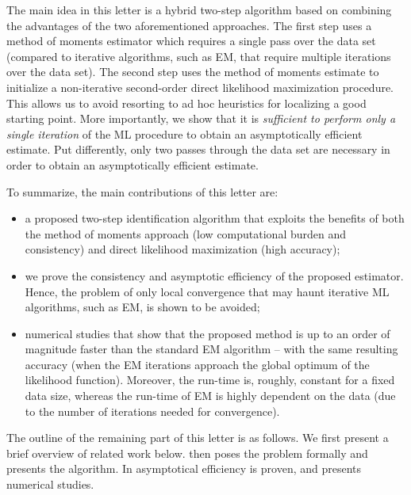 \documentclass[journal]{IEEEtran}
\begin{document}
The main idea in this letter is a hybrid two-step algorithm based on combining the
advantages of the two aforementioned approaches. The first step uses a method of moments
estimator which requires a single pass over the data set (compared to iterative
algorithms, such as EM, that require multiple iterations over the data set). The second
step uses the method of moments estimate to initialize a non-iterative second-order direct
likelihood maximization procedure. This allows us to avoid resorting to ad hoc heuristics
for localizing a good starting point. More importantly, we show that it is
\emph{sufficient to perform only a single iteration} of the ML procedure to obtain an
asymptotically efficient estimate. Put differently, only two passes through the data set
are necessary in order to obtain an asymptotically efficient estimate.

To summarize, the main contributions of this letter are:
\begin{itemize}
\item a proposed two-step identification algorithm that exploits the benefits of
        both the method of moments approach (low computational burden and consistency) and
        direct likelihood maximization (high accuracy);
    \item we prove the consistency and asymptotic efficiency of the proposed
        estimator. Hence, the problem of only local convergence that may haunt
        iterative ML algorithms, such as EM, is shown to be
        avoided;
    \item numerical studies that show that the proposed method is up to an order of
        magnitude faster than the standard EM algorithm -- with the same resulting
        accuracy (when the EM iterations approach the global optimum of the likelihood
        function). Moreover, the run-time is, roughly, constant for a fixed data size,
        whereas the run-time of EM is highly dependent on the data (due to the number of
        iterations needed for convergence).
\end{itemize}

The outline of the remaining part of this letter is as follows. We first present a brief
overview of related work below.   then poses the problem formally
and  presents the algorithm. In  asymptotical
efficiency is proven, and  presents numerical studies.
\end{document}
